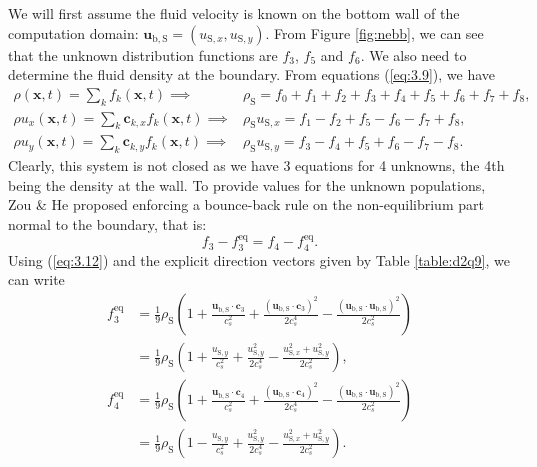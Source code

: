 \documentclass[a4paper, 11pt]{report}
\begin{document}
We will first assume the fluid velocity is known on the bottom wall of the computation domain: $\mathbf{u}_{\mathrm{b,S}} = (u_{\mathrm{S},x}, u_{\mathrm{S},y})$. From Figure \ref{fig:nebb}, we can see that the unknown distribution functions are $f_3$, $f_5$ and $f_6$. We also need to determine the fluid density at the boundary. From equations (\ref{eq:3.9}), we have
\begin{subequations} \label{eq:3.49}
\begin{align}
    \rho(\mathbf{x},t) = \sum_k f_k(\mathbf{x},t) \implies &\rho_\mathrm{S} = f_0 + f_1 + f_2 + f_3 + f_4 + f_5 + f_6 + f_7 + f_8, \label{eq:3.49a} \\
    \rho u_x(\mathbf{x},t) = \sum_k \mathbf{c}_{k,x} f_k(\mathbf{x},t) \implies &\rho_\mathrm{S} u_{\mathrm{S},x} = f_1 - f_2 + f_5 - f_6 - f_7 + f_8, \label{eq:3.49b} \\
    \rho u_y(\mathbf{x},t) = \sum_k \mathbf{c}_{k,y} f_k(\mathbf{x},t) \implies &\rho_\mathrm{S} u_{\mathrm{S},y} = f_3 - f_4 + f_5 + f_6 - f_7 - f_8. \label{eq:3.49c}
\end{align}
\end{subequations}
Clearly, this system is not closed as we have 3 equations for 4 unknowns, the 4th being the density at the wall. To provide values for the unknown populations, Zou \& He proposed enforcing a bounce-back rule on the non-equilibrium part normal to the boundary, that is:
\begin{equation}
    f_3 - f_3^{\mathrm{eq}} = f_4 - f_4^{\mathrm{eq}}. \label{eq:3.50}
\end{equation}
Using (\ref{eq:3.12}) and the explicit direction vectors given by Table \ref{table:d2q9}, we can write
\begin{subequations} \label{eq:3.51}
\begin{align}
    f_3^{\mathrm{eq}} &= \frac{1}{9}\rho_\mathrm{S} \left(1 + \frac{\mathbf{u}_{\mathrm{b,S}}\cdot\mathbf{c}_3}{c_s^2} + \frac{\left(\mathbf{u}_{\mathrm{b,S}}\cdot\mathbf{c}_3\right)^2}{2c_s^4} - \frac{\left(\mathbf{u}_{\mathrm{b,S}}\cdot\mathbf{u}_{\mathrm{b,S}}\right)^2}{2c_s^2}\right) \nonumber \\
    &= \frac{1}{9}\rho_\mathrm{S} \left( 1 + \frac{u_{\mathrm{S},y}}{c_s^2} + \frac{u_{\mathrm{S},y}^2}{2c_s^4} - \frac{u_{\mathrm{S},x}^2 + u_{\mathrm{S},y}^2}{2c_s^2} \right), \label{eq:3.51a}\\
    f_4^{\mathrm{eq}} &= \frac{1}{9}\rho_\mathrm{S} \left(1 + \frac{\mathbf{u}_{\mathrm{b,S}}\cdot\mathbf{c}_4}{c_s^2} + \frac{\left(\mathbf{u}_{\mathrm{b,S}}\cdot\mathbf{c}_4\right)^2}{2c_s^4} - \frac{\left(\mathbf{u}_{\mathrm{b,S}}\cdot\mathbf{u}_{\mathrm{b,S}}\right)^2}{2c_s^2}\right) \nonumber \\ 
    &= \frac{1}{9}\rho_\mathrm{S} \left( 1 - \frac{u_{\mathrm{S},y}}{c_s^2} + \frac{u_{\mathrm{S},y}^2}{2c_s^4} - \frac{u_{\mathrm{S},x}^2 + u_{\mathrm{S},y}^2}{2c_s^2} \right). \label{eq:3.51b}
\end{align}
\end{subequations}
\end{document}
